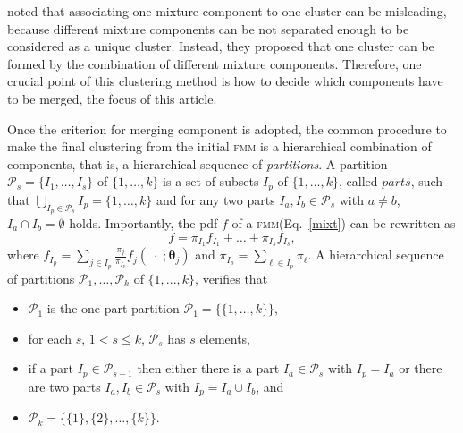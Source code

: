 \documentclass[10pt, a4paper]{article}
\newcommand{\m}[1]{\boldsymbol{#1}}
\newcommand{\fmm}{\textsc{fmm}\xspace}
\begin{document}
\begin{spacing}{1.9}
\cite{lee2004combining,hennig2010methods,baudry2010combining,melnykov2013distribution,pastore2013merging} noted that associating one mixture component to one cluster can be misleading, because different mixture components can be not separated enough to be considered as a unique cluster. Instead, they proposed that one cluster can be formed by the combination of different mixture components. Therefore, one crucial point of this clustering method is how to decide which components have to be merged, the focus of this article.

Once the criterion for merging component is adopted, the common procedure to make the final clustering from the initial \fmm is a hierarchical combination of components, that is, a hierarchical sequence of \emph{partitions}. A partition $\mathcal{P}_s=\{ I_1, \dots, I_s\}$ of $\{1, \dots, k\}$ is a set of subsets $I_p$ of $\{1, \dots, k\}$, called $parts$, such that $\bigcup_{I_p \in \mathcal{P}_s} I_p = \{1, \dots, k\}$ and for any two parts $I_a, I_b \in \mathcal{P}_s$ with $a \neq b$, $I_a \cap I_b = \emptyset$ holds. Importantly, the pdf $f$ of a \fmm (Eq.~\ref{mixt}) can be rewritten as
\begin{equation}
f = \pi_{I_1} f_{I_1} + \dots + \pi_{I_s} f_{I_s},
\label{mixt_part}
\end{equation}
where $f_{I_p} = \sum_{j \in I_p} \frac{\pi_j}{\pi_{I_p}} f_j(\;\cdot\; ; \m\theta_j)$ and $\pi_{I_p} = \sum_{\ell \in I_p} \pi_\ell$. A hierarchical sequence of partitions $\mathcal{P}_1, \dots, \mathcal{P}_k$ of $\{1,...,k\}$, verifies that
  
\begin{itemize}
\item $\mathcal{P}_1$ is the one-part partition $\mathcal{P}_1 = \{ \{1, \dots, k\} \}$,
\item for each $s$, $1 <  s \leq k$, $\mathcal{P}_{s}$ has $s$ elements,
\item if a part $I_p \in \mathcal{P}_{s-1}$ then either there is a part $I_a \in \mathcal{P}_{s}$ with $I_p = I_a$ or there are two parts $I_a, I_b \in \mathcal{P}_s$ with $I_p = I_a \cup I_b$, and
\item $\mathcal{P}_k= \{ \{1\},\{2\}, \dots, \{k\} \}$.
\end{itemize}


\end{spacing}
\end{document}
